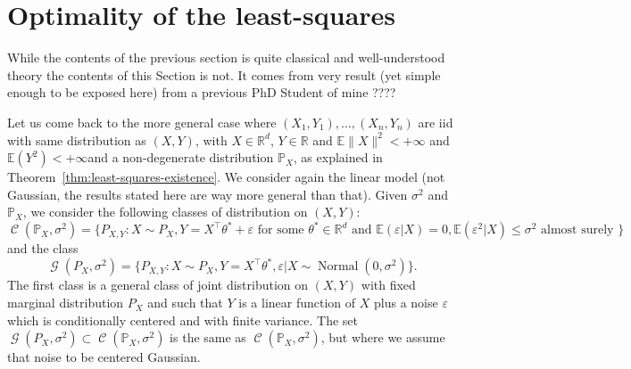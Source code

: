 \documentclass[
	fontsize=11pt, %
	twoside=false, %
	numbers=noenddot, %
]{kaobook}
\DeclareMathOperator{\cC}{{\mathcal C}}
\DeclareMathOperator{\cG}{{\mathcal G}}
\DeclareMathOperator{\nor}{Normal}
\newcommand{\eps}{\varepsilon}
\renewcommand{\P}{\mathbb P}
\newcommand{\E}{\mathbb E}
\newcommand{\R}{\mathbb R}
\newcommand{\norm}[1]{\|#1\|}
\begin{document}
\section{Optimality of the least-squares} %
\label{sec:optimality_of_the_least_squares}

While the contents of the previous section is quite classical and well-understood theory the contents of this Section is not.
It comes from very result (yet simple enough to be exposed here) from a previous PhD Student of mine ????

Let us come back to the more general case where $(X_1, Y_1), \ldots, (X_n, Y_n)$ are iid with same distribution as $(X, Y)$, with $X \in \R^d$, $Y \in \R$ and $\E \norm{X}^2 < +\infty$ and $\E(Y^2) < +\infty$and a non-degenerate distribution $\P_X$, as explained in Theorem~\ref{thm:least-squares-existence}.
We consider again the linear model (not Gaussian, the results stated here are way more general than that).
Given $\sigma^2$ and $\P_X$, we consider the following classes of distribution on $(X, Y)$:
\begin{equation*}
	\cC(\P_X, \sigma^2) = \{ P_{X, Y} : X \sim P_X, Y = X^\top \theta^* + \eps \text{ for some } \theta^* \in \R^d \text{ and } \E(\eps | X) = 0, \E(\eps^2 | X) \leq \sigma^2 \text{ almost surely }\}
\end{equation*}
and the class
\begin{equation*}
	\cG(P_X, \sigma^2) = \{ P_{X, Y} : X \sim P_X, Y = X^\top \theta^*, \eps | X \sim \nor(0, \sigma^2) \}.
\end{equation*}
The first class is a general class of joint distribution on $(X, Y)$ with fixed marginal distribution $P_X$ and such that $Y$ is a linear function of $X$ plus a noise $\eps$ which is conditionally centered and with finite variance. The set $\cG(P_X, \sigma^2) \subset \cC(\P_X, \sigma^2)$ is the same as $\cC(\P_X, \sigma^2)$, but where we assume that noise to be centered Gaussian.
\end{document}
